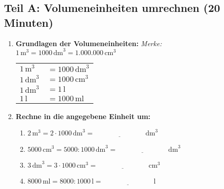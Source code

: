 \subsection*{Teil A: Volumeneinheiten umrechnen (20 Minuten)}

\begin{enumerate}[label=\arabic*.]
    \item \textbf{Grundlagen der Volumeneinheiten:}
    \textit{Merke: $1\,\text{m}^3 = 1000\,\text{dm}^3 = 1.000.000\,\text{cm}^3$}
    \vspace{0.5cm}

    \begin{tabular}{ll}
        $1\,\text{m}^3$ & $= 1000\,\text{dm}^3$ \\
        $1\,\text{dm}^3$ & $= 1000\,\text{cm}^3$ \\
        $1\,\text{dm}^3$ & $= 1\,\text{l}$ \\
        $1\,\text{l}$ & $= 1000\,\text{ml}$
    \end{tabular}

    \vspace{1cm}

    \item \textbf{Rechne in die angegebene Einheit um:}
    \vspace{0.5cm}

    \begin{enumerate}[label=\alph*)]
        \item $2\,\text{m}^3 = 2 \cdot 1000\,\text{dm}^3 = \underline{\hspace{3cm}}\,\text{dm}^3$

        \vspace{0.5cm}

        \item $5000\,\text{cm}^3 = 5000 : 1000\,\text{dm}^3 = \underline{\hspace{3cm}}\,\text{dm}^3$

        \vspace{0.5cm}

        \item $3\,\text{dm}^3 = 3 \cdot 1000\,\text{cm}^3 = \underline{\hspace{3cm}}\,\text{cm}^3$

        \vspace{0.5cm}

        \item $8000\,\text{ml} = 8000 : 1000\,\text{l} = \underline{\hspace{3cm}}\,\text{l}$


\end{enumerate}
\end{enumerate}
